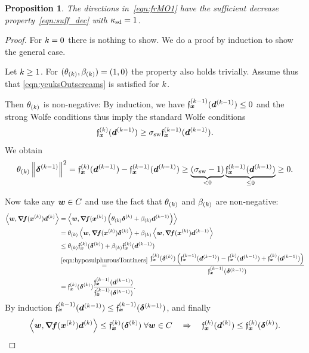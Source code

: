 \documentclass{article}
\theoremstyle{plain}
\newtheorem{proposition}[theorem]{Proposition}
\theoremstyle{definition}
\begin{document}
\begin{proposition}
	The directions in~\eqref{eqn:frMO1}
	have the sufficient decrease property~\eqref{eqn:suff_dec}
	with $\suffDecConst = 1$.
\end{proposition}

\begin{proof}
	For $\kk=0$ there is nothing to show.
	We do a proof by induction to show the general case.

	Let $\kk \geq 1$.
	For $(\theta\kK, \beta\kK) = (1,0)$ the property also holds 
	trivially.
	Assume thus that \eqref{eqn:yeuksOutscreams} is satisfied
	for $\kk$.
	
	Then $\theta\kK$ is non-negative:
	By induction, we have $\funcXKp(\vdKp) \leq 0$ and the strong Wolfe 
	conditions thus imply the standard Wolfe conditions
	$$
	\funcXK(\vdKp) \geq \WolfeConstant \funcXKp(\vdKp).
	$$
	We obtain
	\begin{equation*}
		\theta\kK\norm{\sdKp}^2 
		=
		\funcXK(\vd\KKp)
		-
		\funcXKp(\vd\KKp)
		\geq
		\underbrace{(\WolfeConstant - 1)}_{< 0}
		\underbrace{\funcXKp(\vdKp)}_{\leq 0}
		\geq
		0.
	\end{equation*}	

	Now take any $\ve{w}\in C$ and use the fact that 
	$\theta\kK$ and $\beta\kK$ are non-negative:
	\begin{align*}
		\mul{
			\ve w
		}{
			\jacf(\vxK)
			\vdK
		}
		&=
		\mul{\ve w}{
			\jacf(\vxK)
			\args{\theta\kK\sdK + \beta\kK \vd\KKp}
		}
		\\
		&= 
		\theta\kK\mul{\ve w}{\jacf(\vxK)\sdK}
		+
		\beta\kK\mul{\ve w}{\jacf(\vxK)\vd\KKp}
		\\
		&\leq
		\theta\kK\funcXK(\sdK)
		+
		\beta\kK\funcXK(\vd\KKp)
		\\
		&\stackrel{\eqref{eqn:hyposulphurousTontiners}}=
		\frac{
		\funcXK(\sdK)
		\args{
			\funcXKp(\vd\KKp)
			-
			\funcXK(\vd\KKp)
			+
			\funcXK(\vd\KKp)
		}
		}{\funcXKp(\sd\KKp)}
		\\
		&=
		\funcXK(\sdK)
		\frac{\funcXKp(\vd\KKp)}{\funcXKp(\sd\KKp)}
		.
	\end{align*}
	By induction $\funcXKp(\vd\KKp) \leq \funcXKp(\sd\KKp)$,
	and finally
	$$
	\mul{
		\ve w
		}{
			\jacf(\vxK)
			\vdK
		}
	\leq
	\funcXK(\sdK)
	\;\forall \ve{w}\in C
	\quad\Rightarrow\quad
	\funcXK(\vdK) \leq \funcXK(\sdK).
	$$
\end{proof}
\end{document}
